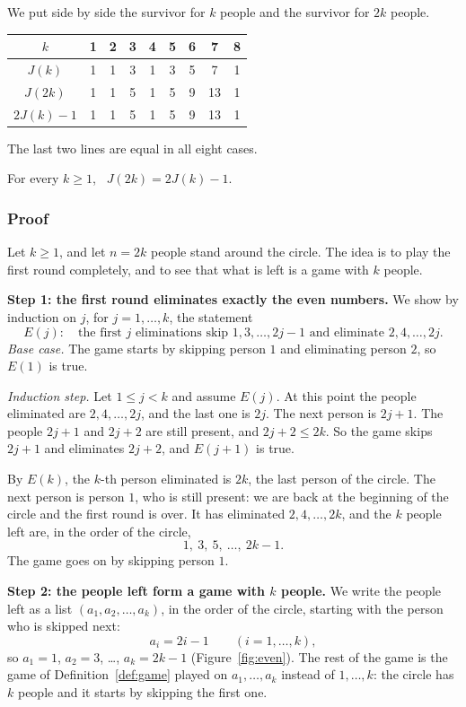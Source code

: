 We put side by side the survivor for $k$ people and the survivor for $2k$
people.
\begin{center}
\renewcommand{\arraystretch}{1.2}
\begin{tabular}{|c|c|c|c|c|c|c|c|c|}
\hline
$k$ & 1 & 2 & 3 & 4 & 5 & 6 & 7 & 8\\ \hline
$J(k)$ & 1 & 1 & 3 & 1 & 3 & 5 & 7 & 1\\ \hline
$J(2k)$ & 1 & 1 & 5 & 1 & 5 & 9 & 13 & 1\\ \hline
$2J(k)-1$ & 1 & 1 & 5 & 1 & 5 & 9 & 13 & 1\\ \hline
\end{tabular}
\end{center}
The last two lines are equal in all eight cases.

\begin{obs}\label{obs:even}
For every $k\geq1$, \ $J(2k)=2J(k)-1$.
\end{obs}

\subsubsection{Proof}

Let $k\geq1$, and let $n=2k$ people stand around the circle. The idea is to
play the first round completely, and to see that what is left is a game with
$k$ people.

\textbf{Step 1: the first round eliminates exactly the even numbers.} We show
by induction on $j$, for $j=1,\dots,k$, the statement
\[
E(j):\quad\text{the first $j$ eliminations skip $1,3,\dots,2j-1$ and
eliminate $2,4,\dots,2j$.}
\]
\emph{Base case.} The game starts by skipping person $1$ and eliminating
person $2$, so $E(1)$ is true.

\emph{Induction step.} Let $1\leq j<k$ and assume $E(j)$. At this point the
people eliminated are $2,4,\dots,2j$, and the last one is $2j$. The next
person is $2j+1$. The people
$2j+1$ and $2j+2$ are still present, and $2j+2\leq2k$. So the game skips
$2j+1$ and eliminates $2j+2$, and $E(j+1)$ is true.

By $E(k)$, the $k$-th person eliminated is $2k$, the last person of the circle. The
next person is person $1$, who is still present: we are back at the beginning
of the circle and the first round is over. It has eliminated
$2,4,\dots,2k$, and the $k$ people left are, in the order of the circle,
\[
1,\ 3,\ 5,\ \dots,\ 2k-1 .
\]
The game goes on by skipping person $1$.

\textbf{Step 2: the people left form a game with $k$ people.} We write the
people left as a list $(a_1,a_2,\dots,a_k)$, in the order of the circle,
starting with the person who is skipped next:
\[
a_i=2i-1\qquad(i=1,\dots,k),
\]
so $a_1=1$, $a_2=3$, \dots, $a_k=2k-1$ (Figure~\ref{fig:even}). The rest of the
game is the game of Definition~\ref{def:game} played on $a_1,\dots,a_k$ instead
of $1,\dots,k$: the circle has $k$ people and it starts by skipping the first
one.

